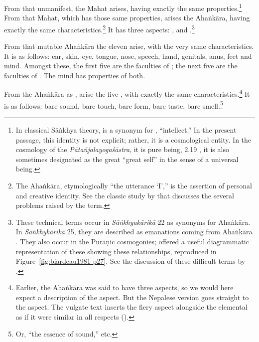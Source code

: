 \begin{translation}
From that unmanifest, the Mahat arises, having exactly the same
properties.\footnote{In classical Sāṅkhya theory,  is a
    synonym for , ``intellect.''  In the present passage, this
    identity is not explicit; rather, it is a cosmological entity.  In the
    cosmology of the \emph{Pātañjalayogaśāstra}, it is pure being,
     2.19 \citep[85]{agas-1904}, it is also sometimes
    designated as the great  ``great self'' in the sense of a
    universal being.} %
    From that Mahat, which has those same properties, arises the
    Ahaṅkāra, having exactly the same characteristics.\footnote{The
        Ahaṅkāra, etymologically ``the utterance `I',''  is the assertion
        of personal and creative identity. See the classic study by
        \citet{buit-1957} that discusses the several problems raised by the
        term.}  It has three aspects: ,
         and
        .\footnote{\label{puraniccosmology}These
            technical terms occur in \emph{Sāṅkhyakārikā} 22 as synonyms for
            Ahaṅkāra.  In \emph{Sāṅkhykārikā} 25, they are described as
            emanations coming from Ahaṅkāra \parencites[46--47,
            50]{sast-1948}[187--188, 195--196]{wezl-1998}. They also occur in
            the Purāṇic cosmogonies; \citet[27]{biar-1981} offered a useful
            diagrammatic representation of these showing these relationships,
            reproduced in Figure~\ref{fig:biardeau1981-p27}.  See the
            discussion of these difficult terms by \citet[23--25]{buit-1957}.}

            
            From that mutable Ahaṅkāra the 
            eleven  arise, with the very same
            characteristics. It is as follows: ear, skin, eye, tongue, nose,
            speech, hand, genitals, anus, feet and mind.  Amongst these, the first 
            five are the faculties of ; the next five are the 
            faculties of .  The mind has properties of both.
            
            From the Ahaṅkāra as , arise the five ,
with exactly the same characteristics.\footnote{Earlier,
    the Ahaṅkāra was said to have three aspects, so we would
    here expect a description of the 
    aspect.  But the Nepalese version goes straight to the
     aspect.  The vulgate text inserts
    the fiery aspect alongside the elemental as if it were
    similar in all respects ().}  It is as
    follows: bare sound, bare touch, bare form, bare taste,
    bare smell.\footnote{Or, ``the essence of sound,'' etc.}
    

\end{translation}
